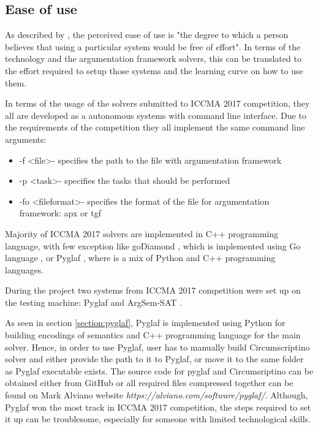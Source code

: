 
\subsection{Ease of use}
As described by \citet{easeOfUse}, the perceived ease of use is "the degree to which a person believes that using a particular system would be free of effort". In terms of the technology and the argumentation framework solvers, this can be translated to the effort required to setup those systems and the learning curve on how to use them. 

In terms of the usage of the solvers submitted to ICCMA 2017 competition, they all are developed as a autonomous systems with command line interface. Due to the requirements of the competition they all implement the same command line arguments:

\begin{itemize}
	\item -f \textless file\textgreater - specifies the path to the file with argumentation framework
	\item -p \textless task\textgreater - specifies the tasks that should be performed
	\item -fo \textless fileformat\textgreater - specifies the format of the file for argumentation framework: apx or tgf
\end{itemize}

Majority of ICCMA 2017 solvers are implemented in C++ programming language, with few exception like goDiamond \citep{goDiamond}, which is implemented using Go language \citep{GoLang}, or Pyglaf \citep{pyglaf}, where is a mix of Python and C++ programming languages. 

During the project two systems from ICCMA 2017 competition were set up on the testing machine: Pyglaf \citep{pyglaf} and ArgSem-SAT \citep{argsemsat}. 

As seen in section \ref{section:pyglaf}, Pyglaf is implemented using Python for building encodings of semantics and C++ programming language for the main solver. Hence, in order to use Pyglaf, user has to manually build Circumscriptino \citep{circumscriptino} solver and either provide the path to it to Pyglaf, or move it to the same folder as Pyglaf executable exists. The source code for pyglaf and Circumsriptino can be obtained either from GitHub or all required files compressed together can be found on Mark Alviano website \textit{https://alviano.com/software/pyglaf/}. Although, Pyglaf won the most track in ICCMA 2017 competition, the steps required to set it up can be troublesome, especially for someone with limited technological skills. 


